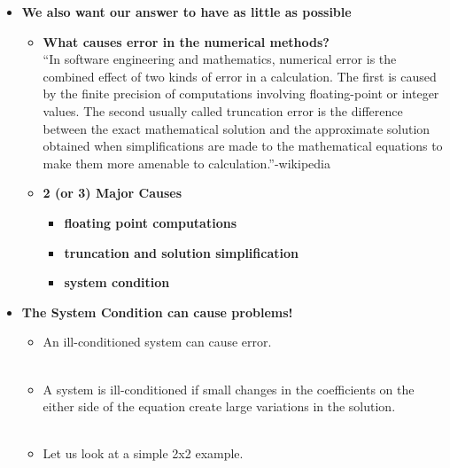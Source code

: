 \documentclass[11pt]{article}
\newcommand{\B}{\color{blue}}
\newcommand{\PR}{\color{mypurple}}
\begin{document}
\begin{itemize}
\newpage 
\newpage
\Large
\item \textbf{ We also want our answer to have as little  as possible} \\
	\begin{itemize}
		\item \textbf{What causes error in the numerical methods?} \\
			``In software engineering and mathematics, numerical error is the combined effect of two kinds of error in a calculation. The first is caused by the finite precision of computations involving floating-point or integer values. The second usually called truncation error is the difference between the exact mathematical solution and the approximate solution obtained when simplifications are made to the mathematical equations to make them more amenable to calculation.''-wikipedia\\
		\item \textbf{2 (or 3) Major Causes} \\
			\begin{itemize}
				\item \textbf{floating point computations} \vspace{20mm}\\
				\item \textbf{truncation and solution simplification} \vspace{20mm}\\
				\item \textbf{system condition} \vspace{20mm}\\
			\end{itemize}
	\end{itemize}

\newpage
\item \textbf{ The {\B System Condition} can cause problems!} \\
\begin{itemize}
	\item An {\PR ill-conditioned} system can cause error. \\\\
	
	\item A system is {\PR ill-conditioned} if small changes in the coefficients on the either side of the equation create large variations in the solution.\\\\

	\item Let us look at a simple 2x2 example. \\\\
	

\end{itemize}
\end{itemize}
\end{document}
